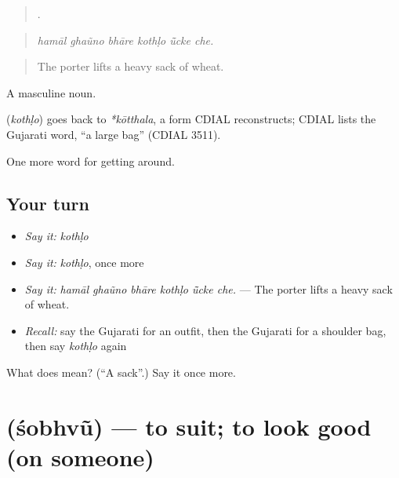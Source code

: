\begin{quote}
     .
\end{quote}

\begin{quote}
\emph{hamāl ghaũno bhāre kothḷo ū̃cke che.}
\end{quote}

\begin{quote}
The porter lifts a heavy sack of wheat.
\end{quote}

A masculine noun.

\begin{cousinweb}
\textbf{} (\emph{kothḷo}) goes back to \emph{*kōtthala}, a form CDIAL reconstructs; CDIAL lists the Gujarati word, \textquotedblleft{}a large bag\textquotedblright{} (CDIAL 3511).
\end{cousinweb}

\begin{grammarlens}[title={What you've built}]
One more word for getting around.
\end{grammarlens}

\subsection*{Your turn}
\begin{itemize}
\raggedright
  \item \emph{Say it:} \emph{kothḷo}
  \item \emph{Say it:} \emph{kothḷo}, once more
  \item \emph{Say it:} \emph{hamāl ghaũno bhāre kothḷo ū̃cke che.} — The porter lifts a heavy sack of wheat.
  \item \emph{Recall:} say the Gujarati for an outfit, then the Gujarati for a shoulder bag, then say \emph{kothḷo} again
\end{itemize}

\begin{tcolorbox}[breakable,colback=teal!4,colframe=teal!35!black,title={Before you move on}]
What does  mean? (\textquotedblleft{}A sack\textquotedblright{}.) Say it once more.
\end{tcolorbox}
\section[\texorpdfstring{\gu{શોભવું} (śobhvũ)}{શોભવું (śobhvũ)}]{ (śobhvũ) — to suit; to look good (on someone)}

